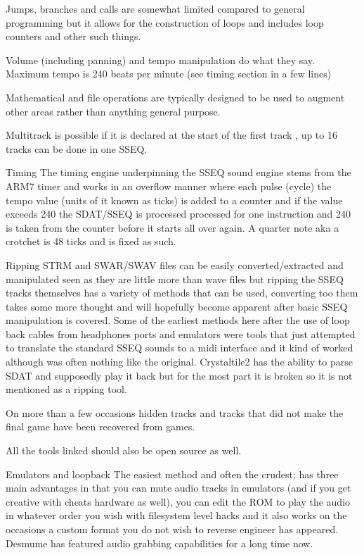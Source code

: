 \documentclass[
]{book}
\begin{document}
Jumps, branches and calls are somewhat limited compared to general programming but it allows for the construction of loops and includes loop counters and other such things.

Volume (including panning) and tempo manipulation do what they say. Maximum tempo is 240 beats per minute (see timing section in a few lines)

Mathematical and file operations are typically designed to be used to augment other areas rather than anything general purpose.

Multitrack is possible if it is declared at the start of the first track , up to 16 tracks can be done in one SSEQ.

Timing The timing engine underpinning the SSEQ sound engine stems from the ARM7 timer and works in an overflow manner where each pulse (cycle) the tempo value (units of it known as ticks) is added to a counter and if the value exceeds 240 the SDAT/SSEQ is processed processed for one instruction and 240 is taken from the counter before it starts all over again. A quarter note aka a crotchet is 48 ticks and is fixed as such.

Ripping STRM and SWAR/SWAV files can be easily converted/extracted and manipulated seen as they are little more than wave files but ripping the SSEQ tracks themselves has a variety of methods that can be used, converting too them takes some more thought and will hopefully become apparent after basic SSEQ manipulation is covered. Some of the earliest methods here after the use of loop back cables from headphones ports and emulators were tools that just attempted to translate the standard SSEQ sounds to a midi interface and it kind of worked although was often nothing like the original. Crystaltile2 has the ability to parse SDAT and supposedly play it back but for the most part it is broken so it is not mentioned as a ripping tool.

On more than a few occasions hidden tracks and tracks that did not make the final game have been recovered from games.

All the tools linked should also be open source as well.

Emulators and loopback The easiest method and often the crudest; has three main advantages in that you can mute audio tracks in emulators (and if you get creative with cheats hardware as well), you can edit the ROM to play the audio in whatever order you wish with filesystem level hacks and it also works on the occasions a custom format you do not wish to reverse engineer has appeared. Desmume has featured audio grabbing capabilities for a long time now.
\end{document}
